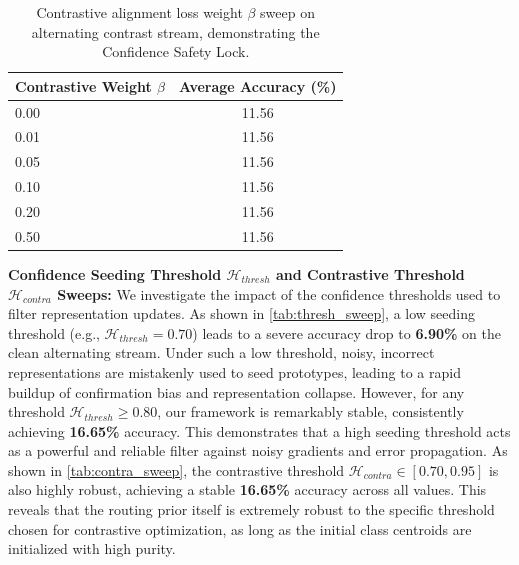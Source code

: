 \documentclass{article}
\theoremstyle{plain}
\theoremstyle{definition}
\theoremstyle{remark}
\begin{document}
\begin{table}[h]
\caption{Contrastive alignment loss weight $\beta$ sweep on alternating contrast stream, demonstrating the Confidence Safety Lock.}
\label{tab:beta_sweep}
\begin{center}
\begin{small}
\begin{tabular}{lc}
\toprule
Contrastive Weight $\beta$ & Average Accuracy (\%) \\
\midrule
0.00 & 11.56 \\
0.01 & 11.56 \\
0.05 & 11.56 \\
0.10 & 11.56 \\
0.20 & 11.56 \\
0.50 & 11.56 \\
\bottomrule
\end{tabular}
\end{small}
\end{center}
\end{table}

\textbf{Confidence Seeding Threshold $\mathcal{H}_{thresh}$ and Contrastive Threshold $\mathcal{H}_{contra}$ Sweeps:} We investigate the impact of the confidence thresholds used to filter representation updates. As shown in \cref{tab:thresh_sweep}, a low seeding threshold (e.g., $\mathcal{H}_{thresh}=0.70$) leads to a severe accuracy drop to \textbf{6.90\%} on the clean alternating stream. Under such a low threshold, noisy, incorrect representations are mistakenly used to seed prototypes, leading to a rapid buildup of confirmation bias and representation collapse. However, for any threshold $\mathcal{H}_{thresh} \ge 0.80$, our framework is remarkably stable, consistently achieving \textbf{16.65\%} accuracy. This demonstrates that a high seeding threshold acts as a powerful and reliable filter against noisy gradients and error propagation.
As shown in \cref{tab:contra_sweep}, the contrastive threshold $\mathcal{H}_{contra} \in [0.70, 0.95]$ is also highly robust, achieving a stable \textbf{16.65\%} accuracy across all values. This reveals that the routing prior itself is extremely robust to the specific threshold chosen for contrastive optimization, as long as the initial class centroids are initialized with high purity.
\end{document}
